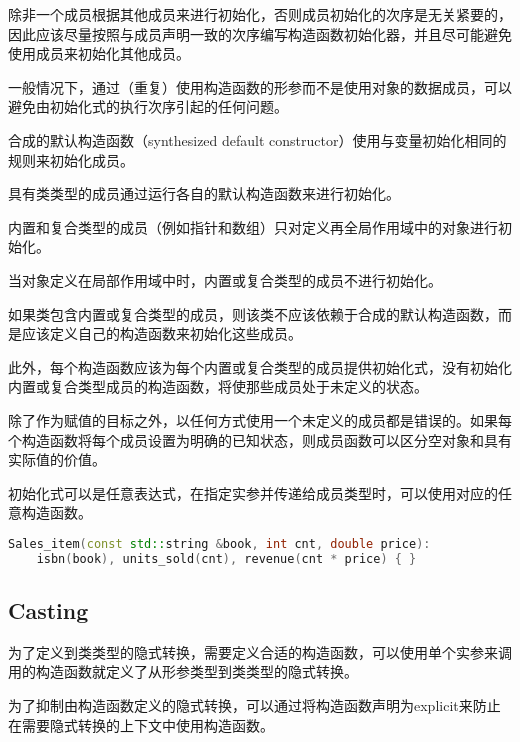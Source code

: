 除非一个成员根据其他成员来进行初始化，否则成员初始化的次序是无关紧要的，因此应该尽量按照与成员声明一致的次序编写构造函数初始化器，并且尽可能避免使用成员来初始化其他成员。

一般情况下，通过（重复）使用构造函数的形参而不是使用对象的数据成员，可以避免由初始化式的执行次序引起的任何问题。

合成的默认构造函数（synthesized default constructor）使用与变量初始化相同的规则来初始化成员。

\begin{compactitem}
\item 具有类类型的成员通过运行各自的默认构造函数来进行初始化。
\item 内置和复合类型的成员（例如指针和数组）只对定义再全局作用域中的对象进行初始化。
\item 当对象定义在局部作用域中时，内置或复合类型的成员不进行初始化。
\end{compactitem}

如果类包含内置或复合类型的成员，则该类不应该依赖于合成的默认构造函数，而是应该定义自己的构造函数来初始化这些成员。

此外，每个构造函数应该为每个内置或复合类型的成员提供初始化式，没有初始化内置或复合类型成员的构造函数，将使那些成员处于未定义的状态。

除了作为赋值的目标之外，以任何方式使用一个未定义的成员都是错误的。如果每个构造函数将每个成员设置为明确的已知状态，则成员函数可以区分空对象和具有实际值的价值。


初始化式可以是任意表达式，在指定实参并传递给成员类型时，可以使用对应的任意构造函数。

\begin{lstlisting}[language=C++]
Sales_item(const std::string &book, int cnt, double price):
	isbn(book), units_sold(cnt), revenue(cnt * price) { }
\end{lstlisting}

\subsection{Casting}

\begin{compactitem}
\item 为了定义到类类型的隐式转换，需要定义合适的构造函数，可以使用单个实参来调用的构造函数就定义了从形参类型到类类型的隐式转换。
\item 为了抑制由构造函数定义的隐式转换，可以通过将构造函数声明为explicit来防止在需要隐式转换的上下文中使用构造函数。
\end{compactitem}




